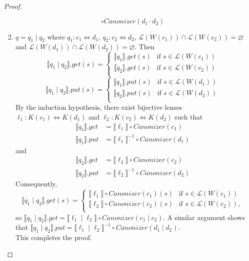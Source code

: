\documentclass{svproc}
\newcommand{\sep}{\ensuremath{\; | \;}}
\newcommand{\canonizer}{\ensuremath{\mathit{Canonizer}}}
\begin{document}
\begin{proof}
\begin{enumerate}
$$    \circ \canonizer(d_1 \cdot d_2) $$
  \item
    $q = q_1 \sep q_2$ where $q_1 : c_1 \Leftrightarrow d_1 $, $q_2 : c_2
    \Leftrightarrow d_2$, $\mathcal{L}(W(c_1)) \cap \mathcal{L}(W(c_2)) =
    \varnothing$ and $\mathcal{L}(W(d_1)) \cap \mathcal{L}(W(d_2)) = \varnothing$.
    Then
    $$
    \llbracket q_1 \sep q_2 \rrbracket.get(s) = 
    \begin{cases}
      \llbracket q_1 \rrbracket.get (s) & \text{if } s \in \mathcal{L}(W(c_1))\\
      \llbracket q_2 \rrbracket.get (s) & \text{if } s \in \mathcal{L}(W(c_2))\\
    \end{cases}$$
    $$\llbracket q_1 \sep q_2 \rrbracket.put(s) = 
    \begin{cases}
      \llbracket q_1 \rrbracket.put (s) & \text{if } s \in \mathcal{L}(W(d_1))\\
      \llbracket q_2 \rrbracket.put (s) & \text{if } s \in \mathcal{L}(W(d_2))\\
    \end{cases}
    $$
    By the induction hypothesis, there exist bijective lenses $\ell_1 : K(c_1)
    \Leftrightarrow K(d_1)$ and $\ell_2 : K(c_2) \Leftrightarrow K(d_2)$ such that
    \begin{align*}
      \llbracket q_1 \rrbracket.get &= \llbracket \ell_1 \rrbracket \circ
                                      \canonizer(c_1)\\
      \llbracket q_1 \rrbracket.put &= {\llbracket \ell_1 \rrbracket}^{-1} \circ
                                      \canonizer(d_1)
    \end{align*}
    and
    \begin{align*}
      \llbracket q_2 \rrbracket.get &= \llbracket \ell_2 \rrbracket \circ
                                      \canonizer(c_2)\\
      \llbracket q_2 \rrbracket.put &= {\llbracket \ell_2 \rrbracket}^{-1} \circ
                                      \canonizer(d_2)
    \end{align*}
    Consequently,
    $$
    \llbracket q_1 \sep q_2 \rrbracket.get(s) = 
    \begin{cases}
      \llbracket \ell_1 \rrbracket \circ
      \canonizer(c_1) (s) & \text{if } s \in \mathcal{L}(W(c_1))\\
      \llbracket \ell_2 \rrbracket \circ
      \canonizer(c_2) (s) & \text{if } s \in \mathcal{L}(W(c_2)),\\
    \end{cases}$$
    so $\llbracket q_1 \sep q_2 \rrbracket.get = \llbracket \ell_1 \sep
    \ell_2 \rrbracket \circ \canonizer(c_1 \sep c_2)$. A similar argument shows
    that $\llbracket q_1 \sep q_2 \rrbracket.put = \llbracket \ell_1 \sep
    \ell_2 \rrbracket^{-1} \circ \canonizer(d_1 \sep d_2)$.\\
    This completes the proof.
  \end{enumerate}
\end{proof}
\end{document}
